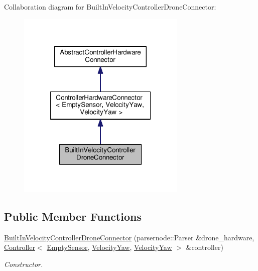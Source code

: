 Collaboration diagram for Built\-In\-Velocity\-Controller\-Drone\-Connector\-:\nopagebreak
\begin{figure}[H]
\begin{center}
\leavevmode
\includegraphics[width=228pt]{classBuiltInVelocityControllerDroneConnector__coll__graph}
\end{center}
\end{figure}
\subsection*{Public Member Functions}
\begin{DoxyCompactItemize}
\item 
\hyperlink{classBuiltInVelocityControllerDroneConnector_a2a9693047db6fcdadea21d54bfe10fc1}{Built\-In\-Velocity\-Controller\-Drone\-Connector} (parsernode\-::\-Parser \&drone\-\_\-hardware, \hyperlink{classController}{Controller}$<$ \hyperlink{structEmptySensor}{Empty\-Sensor}, \hyperlink{structVelocityYaw}{Velocity\-Yaw}, \hyperlink{structVelocityYaw}{Velocity\-Yaw} $>$ \&controller)
\begin{DoxyCompactList}\small\item\em Constructor. \end{DoxyCompactList}\end{DoxyCompactItemize}

